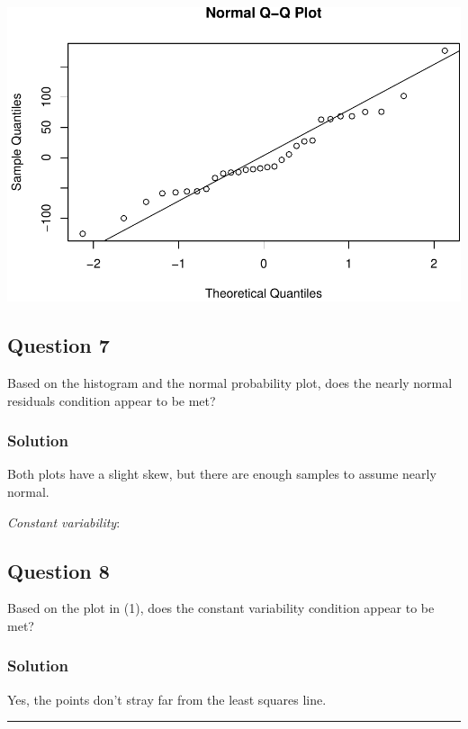 \documentclass[]{article}
\begin{document}
\includegraphics{DATA_606_Lab_7_files/figure-latex/qq-res-1.pdf}

\subsection{Question 7}\label{question-7}

Based on the histogram and the normal probability plot, does the nearly
normal residuals condition appear to be met?

\subsubsection{Solution}\label{solution-6}

Both plots have a slight skew, but there are enough samples to assume
nearly normal.

\emph{Constant variability}:

\subsection{Question 8}\label{question-8}

Based on the plot in (1), does the constant variability condition appear
to be met?

\subsubsection{Solution}\label{solution-7}

Yes, the points don't stray far from the least squares line.

\begin{center}\rule{0.5\linewidth}{\linethickness}\end{center}
\end{document}
